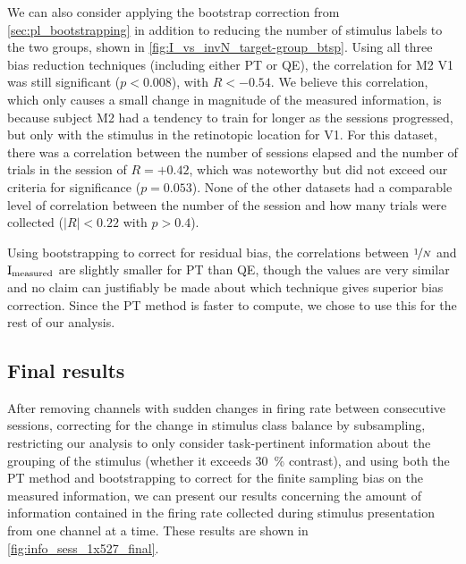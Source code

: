 
We can also consider applying the bootstrap correction from \autoref{sec:pl_bootstrapping} in addition to reducing the number of stimulus labels to the two groups, shown in \autoref{fig:I_vs_invN_target-group_btsp}.
Using all three bias reduction techniques (including either \ac{PT} or \ac{QE}), the correlation for \ac{M2} \ac{V1} was still significant ($p < 0.008$), with $R<-0.54$.
We believe this correlation, which only causes a small change in magnitude of the measured information, is because subject \ac{M2} had a tendency to train for longer as the sessions progressed, but only with the stimulus in the retinotopic location for \ac{V1}.
For this dataset, there was a correlation between the number of sessions elapsed and the number of trials in the session of $R=+0.42$, which was noteworthy but did not exceed our criteria for significance ($p=0.053$).
None of the other datasets had a comparable level of correlation between the number of the session and how many trials were collected ($|R|<0.22$ with $p > 0.4$).

Using bootstrapping to correct for residual bias, the correlations between $\nicefrac{1}{N}$ and $\operatorname{I}_\text{measured}$ are slightly smaller for \ac{PT} than \ac{QE}, though the values are very similar and no claim can justifiably be made about which technique gives superior bias correction.
Since the \ac{PT} method is faster to compute, we chose to use this for the rest of our analysis.


\subsection{Final results}
\label{sec:pl_initial_final}

After removing channels with sudden changes in firing rate between consecutive sessions, correcting for the change in stimulus class balance by subsampling, restricting our analysis to only consider task-pertinent information about the grouping of the stimulus (whether it exceeds \SI{30}{\percent} contrast), and using both the \ac{PT} method and bootstrapping to correct for the finite sampling bias on the measured information, we can present our results concerning the amount of information contained in the firing rate collected during stimulus presentation from one channel at a time.
These results are shown in \autoref{fig:info_sess_1x527_final}.

